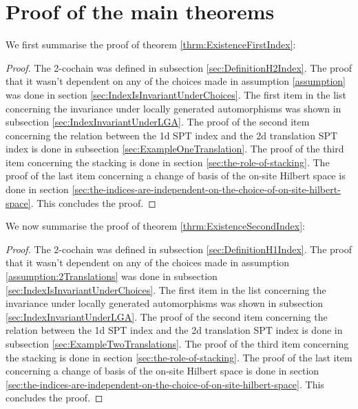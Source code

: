 \documentclass[11pt,a4paper,twoside]{article}
\numberwithin{equation}{section}
\begin{document}
	\section{Proof of the main theorems}\label{sec:ProofOfMainTheorems}
	We first summarise the proof of theorem \ref{thrm:ExistenceFirstIndex}:
	\begin{proof}
		The 2-cochain was defined in subsection \ref{sec:DefinitionH2Index}. The proof that it wasn't dependent on any of the choices made in assumption \ref{assumption} was done in section \ref{sec:IndexIsInvariantUnderChoices}. The first item in the list concerning the invariance under locally generated automorphisms was shown in subsection \ref{sec:IndexInvariantUnderLGA}. The proof of the second item concerning the relation between the 1d SPT index and the 2d translation SPT index is done in subsection \ref{sec:ExampleOneTranslation}. The proof of the third item concerning the stacking is done in section \ref{sec:the-role-of-stacking}. The proof of the last item concerning a change of basis of the on-site Hilbert space is done in section \ref{sec:the-indices-are-independent-on-the-choice-of-on-site-hilbert-space}. This concludes the proof.
	\end{proof}
	We now summarise the proof of theorem \ref{thrm:ExistenceSecondIndex}:
	\begin{proof}
		The 2-cochain was defined in subsection \ref{sec:DefinitionH1Index}. The proof that it wasn't dependent on any of the choices made in assumption \ref{assumption:2Translations} was done in subsection \ref{sec:IndexIsInvariantUnderChoices}. The first item in the list concerning the invariance under locally generated automorphisms was shown in subsection \ref{sec:IndexInvariantUnderLGA}. The proof of the second item concerning the relation between the 1d SPT index and the 2d translation SPT index is done in subsection \ref{sec:ExampleTwoTranslations}. The proof of the third item concerning the stacking is done in section \ref{sec:the-role-of-stacking}. The proof of the last item concerning a change of basis of the on-site Hilbert space is done in section \ref{sec:the-indices-are-independent-on-the-choice-of-on-site-hilbert-space}. This concludes the proof.
	\end{proof}
\end{document}
